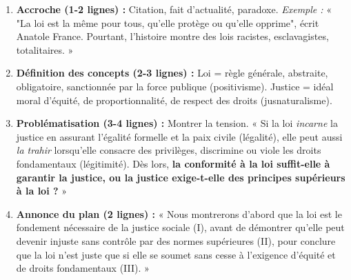 \documentclass[11pt]{article}
\newcommand{\cle}[1]{{\popxbold\color{popdark}#1}}
\begin{document}
\begin{methode}
\begin{enumerate}
\item \textbf{Accroche (1-2 lignes) :} Citation, fait d'actualité, paradoxe. \emph{Exemple :} « "La loi est la même pour tous, qu'elle protège ou qu'elle opprime", écrit Anatole France. Pourtant, l'histoire montre des lois racistes, esclavagistes, totalitaires. »
\item \textbf{Définition des concepts (2-3 lignes) :} \cle{Loi} = règle générale, abstraite, obligatoire, sanctionnée par la force publique (positivisme). \cle{Justice} = idéal moral d'équité, de proportionnalité, de respect des droits (jusnaturalisme).
\item \textbf{Problématisation (3-4 lignes) :} Montrer la tension. « Si la loi \emph{incarne} la justice en assurant l'égalité formelle et la paix civile (légalité), elle peut aussi \emph{la trahir} lorsqu'elle consacre des privilèges, discrimine ou viole les droits fondamentaux (légitimité). Dès lors, \textbf{la conformité à la loi suffit-elle à garantir la justice, ou la justice exige-t-elle des principes supérieurs à la loi ?} »
\item \textbf{Annonce du plan (2 lignes) :} « Nous montrerons d'abord que la loi est le fondement nécessaire de la justice sociale (I), avant de démontrer qu'elle peut devenir injuste sans contrôle par des normes supérieures (II), pour conclure que la loi n'est juste que si elle se soumet sans cesse à l'exigence d'équité et de droits fondamentaux (III). »
\end{enumerate}
\end{methode}
\end{document}
